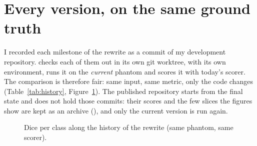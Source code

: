 \section{Every version, on the same ground truth}

I recorded each milestone of the rewrite as a commit of my development repository.
 checks each of them out in its own git worktree, with its own
environment, runs it on the \emph{current} phantom and scores it with today's scorer. The comparison
is therefore fair: same input, same metric, only the code changes (Table~\ref{tab:history},
Figure~\ref{fig:history}). The published repository starts from the final state and does not hold
those commits: their scores and the few slices the figures show are kept as an archive
(), and only the current version is run again.

\begin{table}[ht]
\centering
\small

\caption{Dice score per class on the phantom for every milestone of the rewrite, vessel precision and
  recall, and the cost of segmenting the real stack (wall time and peak memory, all measured on the
  machine described in Chapter~\ref{chap:performance}; ``--'' when that version was not run on the real
  data).}
\label{tab:history}
\end{table}

\begin{figure}[ht]
\centering
{}
\caption{Dice per class along the history of the rewrite (same phantom, same scorer).}
\label{fig:history}
\end{figure}

